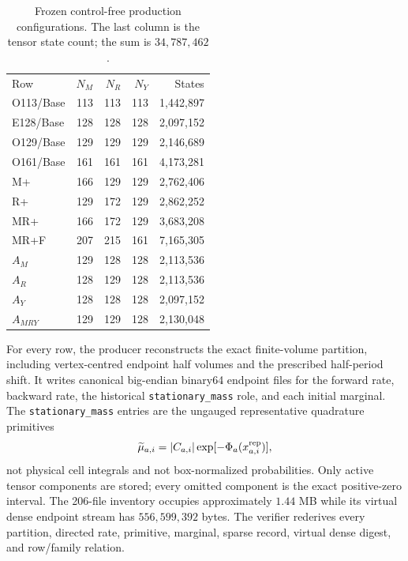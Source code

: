 \documentclass[aps,physrev,onecolumn,amsmath,amssymb,longbibliography]{revtex4-2}
\begin{document}
\begin{table}[t]
\caption{Frozen control-free production configurations.  The last column is
the tensor state count; the sum is $34{,}787{,}462$.}
\label{tab:production-initial-family}
\begin{ruledtabular}
\begin{tabular}{lrrr r}
Row & $N_M$ & $N_R$ & $N_Y$ & States\\
\colrule
O113/Base & 113 & 113 & 113 & 1,442,897\\
E128/Base & 128 & 128 & 128 & 2,097,152\\
O129/Base & 129 & 129 & 129 & 2,146,689\\
O161/Base & 161 & 161 & 161 & 4,173,281\\
M+        & 166 & 129 & 129 & 2,762,406\\
R+        & 129 & 172 & 129 & 2,862,252\\
MR+       & 166 & 172 & 129 & 3,683,208\\
MR+F      & 207 & 215 & 161 & 7,165,305\\
$A_M$     & 129 & 128 & 128 & 2,113,536\\
$A_R$     & 128 & 129 & 128 & 2,113,536\\
$A_Y$     & 128 & 128 & 128 & 2,097,152\\
$A_{MRY}$ & 129 & 129 & 128 & 2,130,048\\
\end{tabular}
\end{ruledtabular}
\end{table}

For every row, the producer reconstructs the exact finite-volume partition,
including vertex-centred endpoint half volumes and the prescribed half-period
shift.  It writes canonical big-endian binary64 endpoint files for the forward
rate, backward rate, the historical \texttt{stationary\_mass} role, and each
initial marginal.  The \texttt{stationary\_mass} entries are the ungauged
representative quadrature primitives
\[
 \widetilde\mu_{a,i}
 =|C_{a,i}|\exp[-\Phi_a(x_{a,i}^{\rm rep})],
\]
not physical cell integrals and not box-normalized probabilities.  Only active
tensor components are stored; every omitted component is the exact
positive-zero interval.  The 206-file inventory occupies approximately
\(1.44\) MB while its virtual dense endpoint stream has \(556{,}599{,}392\)
bytes.  The verifier rederives every partition, directed rate, primitive,
marginal, sparse record, virtual dense digest, and row/family relation.
\end{document}
